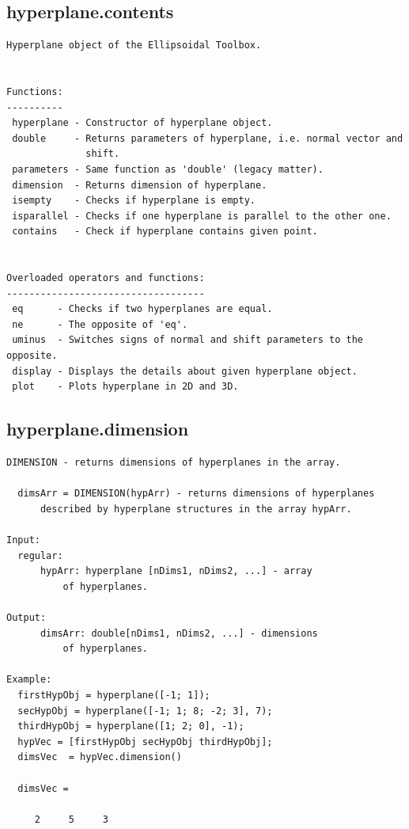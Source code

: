 \documentclass[letterpaper,10pt,english]{sphinxmanual}
\begin{document}
\subsection{hyperplane.contents}
\label{chap_functions:hyperplane-contents}
\begin{Verbatim}[commandchars=\\\{\}]
Hyperplane object of the Ellipsoidal Toolbox.


Functions:
----------
 hyperplane - Constructor of hyperplane object.
 double     - Returns parameters of hyperplane, i.e. normal vector and
              shift.
 parameters - Same function as 'double' (legacy matter).
 dimension  - Returns dimension of hyperplane.
 isempty    - Checks if hyperplane is empty.
 isparallel - Checks if one hyperplane is parallel to the other one.
 contains   - Check if hyperplane contains given point.


Overloaded operators and functions:
-----------------------------------
 eq      - Checks if two hyperplanes are equal.
 ne      - The opposite of 'eq'.
 uminus  - Switches signs of normal and shift parameters to the opposite.
 display - Displays the details about given hyperplane object.
 plot    - Plots hyperplane in 2D and 3D.
\end{Verbatim}


\subsection{hyperplane.dimension}
\label{chap_functions:hyperplane-dimension}
\begin{Verbatim}[commandchars=\\\{\}]
DIMENSION - returns dimensions of hyperplanes in the array.

  dimsArr = DIMENSION(hypArr) - returns dimensions of hyperplanes
      described by hyperplane structures in the array hypArr.

Input:
  regular:
      hypArr: hyperplane [nDims1, nDims2, ...] - array
          of hyperplanes.

Output:
      dimsArr: double[nDims1, nDims2, ...] - dimensions
          of hyperplanes.

Example:
  firstHypObj = hyperplane([-1; 1]);
  secHypObj = hyperplane([-1; 1; 8; -2; 3], 7);
  thirdHypObj = hyperplane([1; 2; 0], -1);
  hypVec = [firstHypObj secHypObj thirdHypObj];
  dimsVec  = hypVec.dimension()

  dimsVec =

     2     5     3
\end{Verbatim}
\end{document}

